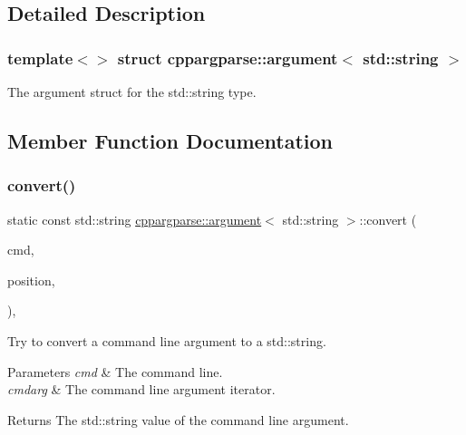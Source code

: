 \subsection{Detailed Description}
\subsubsection*{template$<$$>$\newline
struct cppargparse\+::argument$<$ std\+::string $>$}

The argument struct for the std\+::string type. 

\subsection{Member Function Documentation}
\mbox{\label{structcppargparse_1_1argument_3_01std_1_1string_01_4_aa54c1d7414d89a1071bb7cdb07be0b00}} 
\subsubsection{\texorpdfstring{convert()}{convert()}}
{\footnotesize\ttfamily static const std\+::string \hyperlink{structcppargparse_1_1argument}{cppargparse\+::argument}$<$ std\+::string $>$\+::convert (\begin{DoxyParamCaption}\item[{const types\+::\+Command\+Line\+\_\+t \&}]{cmd,  }\item[{const types\+::\+Command\+Line\+Position\+\_\+t \&}]{position,  }\item[{const types\+::\+Command\+Line\+Arguments\+\_\+t \&}]{ }\end{DoxyParamCaption})\hspace{0.3cm}{\ttfamily [inline]}, {\ttfamily [static]}}



Try to convert a command line argument to a std\+::string. 


\begin{DoxyParams}{Parameters}
{\em cmd} & The command line. \\
\hline
{\em cmdarg} & The command line argument iterator.\\
\hline
\end{DoxyParams}
\begin{DoxyReturn}{Returns}
The std\+::string value of the command line argument. 
\end{DoxyReturn}

